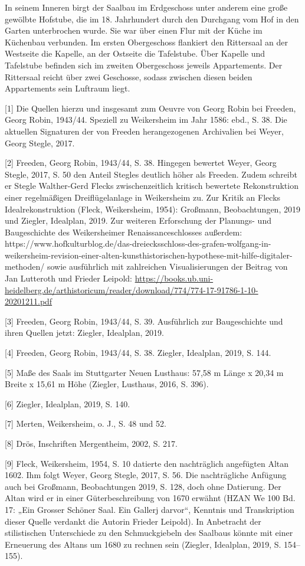 \documentclass[
  letterpaper,
]{book}
\begin{document}
In seinem Inneren birgt der Saalbau im Erdgeschoss unter anderem eine
große gewölbte Hofstube, die im 18. Jahrhundert durch den Durchgang vom
Hof in den Garten unterbrochen wurde. Sie war über einen Flur mit der
Küche im Küchenbau verbunden. Im ersten Obergeschoss flankiert den
Rittersaal an der Westseite die Kapelle, an der Ostseite die Tafelstube.
Über Kapelle und Tafelstube befinden sich im zweiten Obergeschoss
jeweils Appartements. Der Rittersaal reicht über zwei Geschosse, sodass
zwischen diesen beiden Appartements sein Luftraum liegt.

{[}1{]} Die Quellen hierzu und insgesamt zum Oeuvre von Georg Robin bei
Freeden, Georg Robin, 1943/44. Speziell zu Weikersheim im Jahr 1586:
ebd., S. 38. Die aktuellen Signaturen der von Freeden herangezogenen
Archivalien bei Weyer, Georg Stegle, 2017.

{[}2{]} Freeden, Georg Robin, 1943/44, S. 38. Hingegen bewertet Weyer,
Georg Stegle, 2017, S. 50 den Anteil Stegles deutlich höher als Freeden.
Zudem schreibt er Stegle Walther-Gerd Flecks zwischenzeitlich kritisch
bewertete Rekonstruktion einer regelmäßigen Dreiflügelanlage in
Weikersheim zu. Zur Kritik an Flecks Idealrekonstruktion (Fleck,
Weikersheim, 1954): Großmann, Beobachtungen, 2019 und Ziegler,
Idealplan, 2019. Zur weiteren Erforschung der Planungs- und
Baugeschichte des Weikersheimer Renaissanceschlosses außerdem:
https://www.hofkulturblog.de/das-dreiecksschloss-des-grafen-wolfgang-in-weikersheim-revision-einer-alten-kunsthistorischen-hypothese-mit-hilfe-digitaler-methoden/
sowie ausführlich mit zahlreichen Visualisierungen der Beitrag von Jan
Lutteroth und Frieder Leipold:
\url{https://books.ub.uni-heidelberg.de/arthistoricum/reader/download/774/774-17-91786-1-10-20201211.pdf}

{[}3{]} Freeden, Georg Robin, 1943/44, S. 39. Ausführlich zur
Baugeschichte und ihren Quellen jetzt: Ziegler, Idealplan, 2019.

{[}4{]} Freeden, Georg Robin, 1943/44, S. 38. Ziegler, Idealplan, 2019,
S. 144.

{[}5{]} Maße des Saals im Stuttgarter Neuen Lusthaus: 57,58 m Länge x
20,34 m Breite x 15,61 m Höhe (Ziegler, Lusthaus, 2016, S. 396).

{[}6{]} Ziegler, Idealplan, 2019, S. 140.

{[}7{]} Merten, Weikersheim, o. J., S. 48 und 52.

{[}8{]} Drös, Inschriften Mergentheim, 2002, S. 217.

{[}9{]} Fleck, Weikersheim, 1954, S. 10 datierte den nachträglich
angefügten Altan 1602. Ihm folgt Weyer, Georg Stegle, 2017, S. 56. Die
nachträgliche Anfügung auch bei Großmann, Beobachtungen 2019, S. 128,
doch ohne Datierung. Der Altan wird er in einer Güterbeschreibung von
1670 erwähnt (HZAN We 100 Bd. 17: „Ein Grosser Schöner Saal. Ein Gallerj
darvor``, Kenntnis und Transkription dieser Quelle verdankt die Autorin
Frieder Leipold). In Anbetracht der stilistischen Unterschiede zu den
Schmuckgiebeln des Saalbaus könnte mit einer Erneuerung des Altans um
1680 zu rechnen sein (Ziegler, Idealplan, 2019, S. 154--155).
\end{document}
